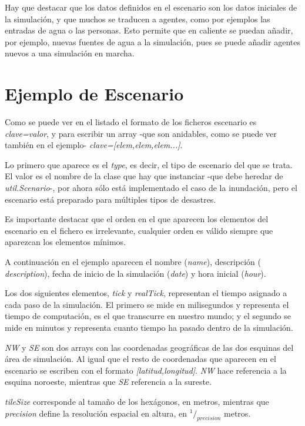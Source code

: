 Hay que destacar que los datos definidos en el escenario son los datos
iniciales de la simulación, y que muchos se traducen a agentes, como por
ejemplos las entradas de agua o las personas. Esto permite que en caliente se
puedan añadir, por ejemplo, nuevas fuentes de agua a la simulación, pues se
puede añadir agentes nuevos a una simulación en marcha.

\section{Ejemplo de Escenario}



Como se puede ver en el listado el formato de los ficheros escenario es {\em
clave=valor}, y para escribir un array -que son anidables, como se puede ver
también en el ejemplo- {\em clave=[elem,elem,elem...]}.

Lo primero que aparece es el {\em type}, es decir, el tipo de escenario del que
se trata. El valor es el nombre de la clase que hay que instanciar -que debe
heredar de {\em util.Scenario}-, por ahora sólo está implementado el caso de la
inundación, pero el escenario está preparado para múltiples tipos de desastres.

Es importante destacar que el orden en el que aparecen los elementos del
escenario en el fichero es irrelevante, cualquier orden es válido siempre que
aparezcan los elementos mínimos.

A continuación en el ejemplo aparecen el nombre ({\em name}), descripción ({\em
description}), fecha de inicio de la simulación ({\em date}) y hora inicial
({\em hour}).

Los dos siguientes elementos, {\em tick} y {\em realTick}, representan el
tiempo asignado a cada paso de la simulación. El primero se mide en
milisegundos y representa el tiempo de computación, es el que transcurre en
nuestro mundo; y el segundo se mide en minutos y representa cuanto tiempo ha
pasado dentro de la simulación.

{\em NW} y {\em SE} son dos arrays con las coordenadas geográficas de las dos
esquinas del área de simulación. Al igual que el resto de coordenadas que
aparecen en el escenario se escriben con el formato {\em [latitud,longitud]}.
{\em NW} hace referencia a la esquina noroeste, mientras que {\em SE}
referencia a la sureste.

{\em tileSize} corresponde al tamaño de los hexágonos, en metros, mientras que
{\em precision} define la resolución espacial en altura, en
\begin{math}^1/_{precision}\end{math} metros.

